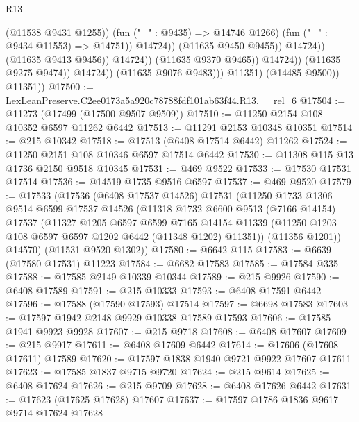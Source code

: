 \begin{lexlean}{R13}
\begin{coremodule}
                                                (@11538 @9431 @1255))
                                              (fun ("_" : @9435) => @14746 @1266)
                                              (fun ("_" : @9434 @11553) => @14751))
                                            @14724))
                                        (@11635 @9450 @9455))
                                      @14724))
                                  (@11635 @9413 @9456))
                                @14724))
                            (@11635 @9370 @9465))
                          @14724))
                      (@11635 @9275 @9474))
                    @14724))
                (@11635 @9076 @9483)))
            @11351)
          (@14485 @9500))
        @11351))
@17500 := LexLeanPreserve.C2ee0173a5a920c78788fdf101ab63f44.R13.__rel_6
@17504 := @11273 (@17499 (@17500 @9507 @9509))
@17510 := @11250 @2154 @108 @10352 @6597 @11262 @6442
@17513 := @11291 @2153 @10348 @10351
@17514 := @215 @10342
@17518 := @17513 (@6408 @17514 @6442) @11262
@17524 := @11250 @2151 @108 @10346 @6597 @17514 @6442
@17530 := @11308 @115 @13 @1736 @2150 @9518 @10345
@17531 := @469 @9522
@17533 := @17530 @17531 @17514
@17536 := @14519 @1735 @9516 @6597
@17537 := @469 @9520
@17579 := @17533
    (@17536
      (@6408 @17537 @14526)
      @17531
      (@11250
        @1733
        @1306
        @9514
        @6599
        @17537
        @14526
        (@11318
          @1732
          @6600
          @9513
          (@7166 @14154)
          @17537
          (@11327
            @1205
            @6597
            @6599
            @7165
            @14154
            @11339
            (@11250 @1203 @108 @6597 @6597 @1202 @6442 (@11348 @1202) @11351))
          (@11356 @1201))
        @14570)
      (@11531 @9520 @1302))
@17580 := @6642 @115
@17583 := @6639 (@17580 @17531) @11223
@17584 := @6682 @17583
@17585 := @17584 @335
@17588 := @17585 @2149 @10339 @10344
@17589 := @215 @9926
@17590 := @6408 @17589
@17591 := @215 @10333
@17593 := @6408 @17591 @6442
@17596 := @17588 (@17590 @17593) @17514
@17597 := @6698 @17583
@17603 := @17597 @1942 @2148 @9929 @10338 @17589 @17593
@17606 := @17585 @1941 @9923 @9928
@17607 := @215 @9718
@17608 := @6408 @17607
@17609 := @215 @9917
@17611 := @6408 @17609 @6442
@17614 := @17606 (@17608 @17611) @17589
@17620 := @17597 @1838 @1940 @9721 @9922 @17607 @17611
@17623 := @17585 @1837 @9715 @9720
@17624 := @215 @9614
@17625 := @6408 @17624
@17626 := @215 @9709
@17628 := @6408 @17626 @6442
@17631 := @17623 (@17625 @17628) @17607
@17637 := @17597 @1786 @1836 @9617 @9714 @17624 @17628

\end{coremodule}
\end{lexlean}
